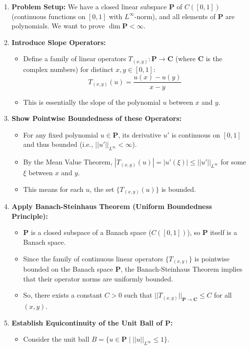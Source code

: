 \begin{enumerate}
	\item \textbf{Problem Setup:} We have a closed linear subspace $\mathbf{P}$ of $C([0,1])$ (continuous functions on $[0,1]$ with $L^\infty$-norm), and all elements of $\mathbf{P}$ are polynomials. We want to prove $\dim \mathbf{P} < \infty$.
	\item \textbf{Introduce Slope Operators:}
	\begin{itemize}
		\item Define a family of linear operators $T_{(x,y)}: \mathbf{P} \to \mathbf{C}$ (where $\mathbf{C}$ is the complex numbers) for distinct $x, y \in [0,1]$:
\[
T_{(x,y)}(u) = \frac{u(x) - u(y)}{x-y}
\]
		\item This is essentially the slope of the polynomial $u$ between $x$ and $y$.
	\end{itemize}
	\item \textbf{Show Pointwise Boundedness of these Operators:}
	\begin{itemize}
		\item For any fixed polynomial $u \in \mathbf{P}$, its derivative $u'$ is continuous on $[0,1]$ and thus bounded (i.e., $||u'||_{L^\infty} < \infty$).
		\item By the Mean Value Theorem, $|T_{(x,y)}(u)| = |u'(\xi)| \le ||u'||_{L^\infty}$ for some $\xi$ between $x$ and $y$.
		\item This means for each $u$, the set $\{T_{(x,y)}(u)\}$ is bounded.
	\end{itemize}
	\item \textbf{Apply Banach-Steinhaus Theorem (Uniform Boundedness Principle):}
	\begin{itemize}
		\item $\mathbf{P}$ is a closed subspace of a Banach space ($C([0,1])$), so $\mathbf{P}$ itself is a Banach space.
		\item Since the family of continuous linear operators $\{T_{(x,y)}\}$ is pointwise bounded on the Banach space $\mathbf{P}$, the Banach-Steinhaus Theorem implies that their operator norms are uniformly bounded.
		\item So, there exists a constant $C > 0$ such that $||T_{(x,y)}||_{\mathbf{P} \to \mathbf{C}} \le C$ for all $(x,y)$.
	\end{itemize}
	\item \textbf{Establish Equicontinuity of the Unit Ball of P:}
	\begin{itemize}
		\item Consider the unit ball $B = \{u \in \mathbf{P} \mid ||u||_{L^\infty} \le 1\}$.

\end{itemize}
\end{enumerate}
